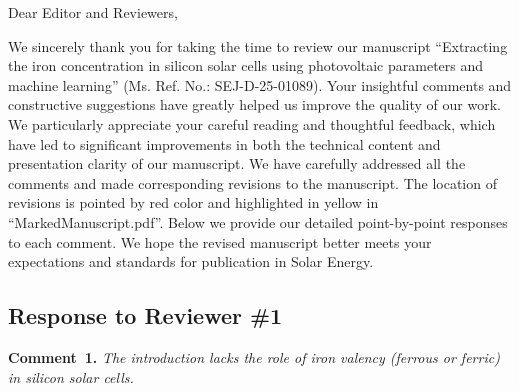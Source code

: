 \documentclass[a4paper,fleqn]{cas-sc}
\begin{document}
\shorttitle{}



Dear Editor and Reviewers,

We sincerely thank you for taking the time to review our manuscript
``Extracting the iron concentration in silicon solar cells using photovoltaic parameters and machine learning''
(Ms. Ref. No.: SEJ-D-25-01089).
Your insightful comments and constructive suggestions have greatly helped us improve
the quality of our work.
We particularly appreciate your careful reading and thoughtful feedback,
which have led to significant improvements in both the technical content and presentation clarity of our manuscript.
We have carefully addressed all the comments and made corresponding revisions to the manuscript.
The location of revisions is pointed by red color and highlighted in yellow in ``MarkedManuscript.pdf''.
Below we provide our detailed point-by-point responses to each comment.
We hope the revised manuscript better meets your expectations and standards for publication in Solar Energy.

\subsection*{Response to Reviewer \#1 }

\noindent
\textcolor[rgb]{0.00,0.50,1.00}{\textbf{Comment~1.}}
\emph{The introduction lacks the role of iron valency (ferrous or ferric) in silicon solar cells.}
\end{document}

